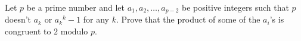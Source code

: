 Let $ p$ be a prime number and let $ a_1,a_2,\ldots,a_{p - 2}$ be positive integers such that $ p$ doesn't $ a_k$ or $ {a_k}^k - 1$ for any $ k$. Prove that the product of some of the $ a_i$'s is congruent to $ 2$ modulo $ p$.